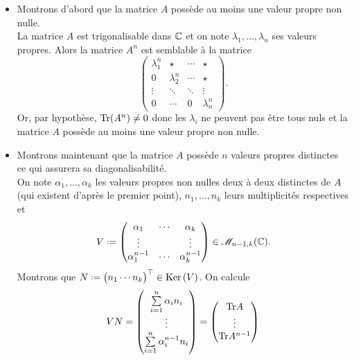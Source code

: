 \begin{preuve}
    \begin{itemize}
        \item Montrons d'abord que la matrice $A$ possède au moins une valeur propre non nulle. \\
        La matrice $A$ est trigonalisable dans $\mathbb{C}$ et on note $\lambda_1, \dots, \lambda_n$ ses valeurs propres. Alors la matrice $A^n$ est semblable à la matrice
        $$
        \begin{pmatrix}
            \lambda_1^n & \star & \cdots & \star \\
            0 & \lambda_2^n & \cdots & \star \\
            \vdots & \ddots &\ddots & \vdots \\
            0 & \cdots & 0 & \lambda_n^n
        \end{pmatrix}.
        $$
        Or, par hypothèse, $\mathrm{Tr}(A^n) \not= 0$ donc les $\lambda_i$ ne peuvent pas être tous nuls et la matrice $A$ possède au moins une valeur propre non nulle.
        \item Montrons maintenant que la matrice $A$ possède $n$ valeurs propres distinctes ce qui assurera sa diagonalisabilité. \\
        On note $\alpha_1, \dots, \alpha_k$ les valeurs propres non nulles deux à deux distinctes de $A$ (qui existent d'après le premier point), $n_1, \dots, n_k$ leurs multiplicités respectives et 
        $$
        V \defeq \begin{pmatrix}
            \alpha_1 & \cdots & \alpha_k \\
            \vdots & & \vdots \\
            \alpha_1^{n-1} & \cdots & \alpha_k^{n-1}
        \end{pmatrix}
        \in \M_{n-1,k}(\C).
        $$
        Montrons que $N \defeq \Trsp{\begin{pmatrix} n_1  \cdots n_k \end{pmatrix}} \in \Ker(V)$. On calcule
        \begin{align*}
            V N = 
            \begin{pmatrix}
                \sum\limits_{i=1}^n \alpha_i n_i \\ 
                \vdots \\ 
                \sum\limits_{i=1}^n \alpha_i^{n-1} n_i
            \end{pmatrix}
            = 
            \begin{pmatrix}
                \mathrm{Tr}{A} \\ \vdots \\ \mathrm{Tr}{A^{n-1}}

\end{pmatrix}
\end{align*}
\end{itemize}
\end{preuve}
